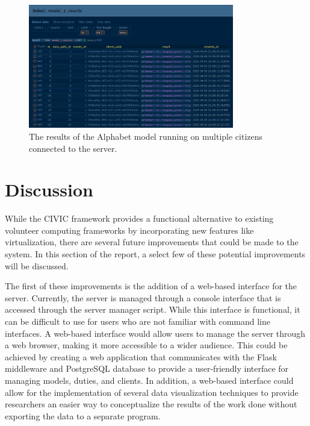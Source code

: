 \documentclass[11pt]{article}
\begin{document}
\begin{figure}[h]
    \centering
    \includegraphics[width=0.8\textwidth]{./figures/alphabet.png}
    \caption{\small The results of the Alphabet model running on multiple citizens connected to the server.}
    \label{fig:alphabet_1}
\end{figure}

\section{Discussion}

While the CIVIC framework provides a functional alternative to existing volunteer computing frameworks by incorporating new features like virtualization, there are several future improvements that could be made to the system. In this section of the report, a select few of these potential improvements will be discussed. 

The first of these improvements is the addition of a web-based interface for the server. Currently, the server is managed through a console interface that is accessed through the server manager script. While this interface is functional, it can be difficult to use for users who are not familiar with command line interfaces. A web-based interface would allow users to manage the server through a web browser, making it more accessible to a wider audience. This could be achieved by creating a web application that communicates with the Flask middleware and PostgreSQL database to provide a user-friendly interface for managing models, duties, and clients. In addition, a web-based interface could allow for the implementation of several data visualization techniques to provide researchers an easier way to conceptualize the results of the work done without exporting the data to a separate program.
\end{document}
